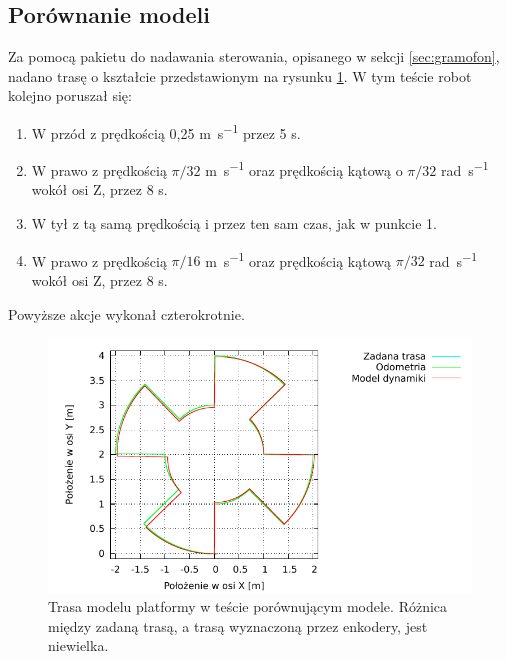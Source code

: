 	\subsection{Porównanie modeli}
		Za pomocą pakietu do nadawania sterowania, opisanego w sekcji \ref{sec:gramofon}, nadano trasę o kształcie przedstawionym na rysunku \ref{plot:comparison_xy}.
		W tym teście robot kolejno poruszał się:
		\begin{enumerate}
			\item W przód z prędkością 0,25 \si{\metre\per\second} przez 5 \si{\second}.
			\item W prawo z prędkością $\pi/32$ \si{\metre\per\second} oraz prędkością kątową o $\pi/32$ \si{\radian\per\second} wokół osi Z, przez 8 \si{\second}.
			\item W tył z tą samą prędkością i przez ten sam czas, jak w punkcie 1.
			\item W prawo z prędkością $\pi/16$ \si{\metre\per\second} oraz prędkością kątową $\pi/32$ \si{\radian\per\second} wokół osi Z, przez 8 \si{\second}.
		\end{enumerate}
		Powyższe akcje wykonał czterokrotnie.
		
		\begin{figure}[h]
			\centering
			\includegraphics[width=\textwidth]{plots/comparison_xy.pdf}
				\caption{Trasa modelu platformy w teście porównującym modele. Różnica między zadaną trasą, a trasą wyznaczoną przez enkodery, jest niewielka.}
			\label{plot:comparison_xy}
		\end{figure}
		
